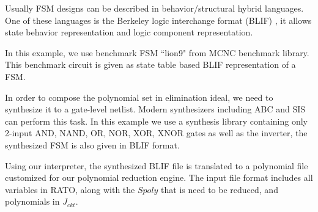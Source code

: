 Usually FSM designs can be described in behavior/structural hybrid languages.
One of these languages is the Berkeley logic interchange format (BLIF) \cite{BLIF},
it allows state behavior representation and logic component representation.

\begin{Example}
In this example, we use benchmark FSM ``lion9" from MCNC benchmark library.
This benchmark circuit is given as state table based BLIF representation of a FSM.


In order to compose the polynomial set in elimination ideal, we need to synthesize it to a 
gate-level netlist. Modern synthesizers including ABC \cite{brayton2010abc} and SIS \cite{SIS} 
can perform this task. In this example we use a synthesis library containing only 2-input 
AND, NAND, OR, NOR, XOR, XNOR gates as well as the inverter, the synthesized FSM is also given in 
BLIF format.


Using our interpreter, the synthesized BLIF file is translated to a polynomial file customized for our 
polynomial reduction engine. 
The input file format includes all 
variables in RATO, along with the $Spoly$ that is need to be reduced, and polynomials in $J_{ckt}$.
% 


\end{Example}
